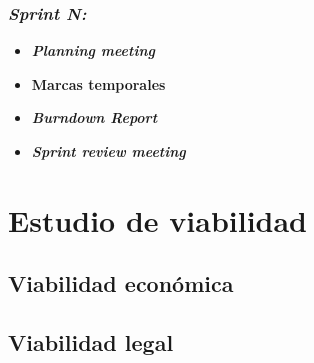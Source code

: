 \subsubsection{\textit{Sprint N:}}
\begin{itemize}
	\item \textbf{\textit{Planning meeting}}
	\item \textbf{Marcas temporales}		
	\item \textbf{\textit{Burndown Report}}
	\item \textbf{\textit{Sprint review meeting}}
\end{itemize}

\section{Estudio de viabilidad}

\subsection{Viabilidad económica}

\subsection{Viabilidad legal}


